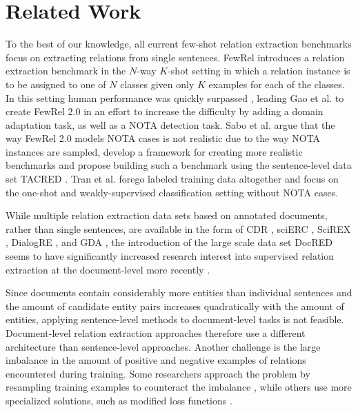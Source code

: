 \documentclass[11pt]{article}
\begin{document}
\section{Related Work}
\label{sec:related_work}

To the best of our knowledge, all current few-shot relation extraction benchmarks \cite{han_fewrel_2018, gao_fewrel_2019, sabo_revisiting_2021} focus on extracting relations from single sentences. 
FewRel \cite{han_fewrel_2018} introduces a relation extraction benchmark in the $N$-way $K$-shot setting \cite{vinyals_matching_2016,snell_prototypical_2017} in which a relation instance is to be assigned to one of $N$ classes given only $K$ examples for each of the classes.
In this setting human performance was quickly surpassed \cite{soares_matching_2019}, leading Gao et al. \cite{gao_fewrel_2019} to create FewRel 2.0 in an effort to increase the difficulty by adding a domain adaptation task, as well as a NOTA detection task. 
Sabo et al. \cite{sabo_revisiting_2021} argue that the way FewRel 2.0 models NOTA cases is not realistic due to the way NOTA instances are sampled, develop a framework for creating more realistic benchmarks and propose building such a benchmark using the sentence-level data set TACRED \cite{zhang_position-aware_2017}.
Tran et al. \cite{tran_one-shot_2021} forego labeled training data altogether and focus on the one-shot and weakly-supervised classification setting without NOTA cases.


While multiple relation extraction data sets based on annotated documents, rather than single sentences, are available in the form of CDR \cite{li_biocreative_2016}, sciERC \cite{luan_multi-task_2018}, SciREX \cite{jain-etal-2020-scirex}, DialogRE \cite{yu2020dialogue}, and GDA \cite{wu_renet_2019}, the introduction of the large scale data set DocRED \cite{yao_docred_2019} seems to have significantly increased research interest into supervised relation extraction at the document-level more recently \cite{zhou_document-level_2020,zhang_document-level_2021,xu_entity_2021,xiao_sais_2021}.

Since documents contain considerably more entities than individual sentences and the amount of candidate entity pairs increases quadratically with the amount of entities, applying sentence-level methods to document-level tasks is not feasible.
Document-level relation extraction approaches therefore use a different architecture \cite{wang_extracting_2019} than sentence-level approaches.
Another challenge is the large imbalance in the amount of positive and negative examples of relations encountered during training. 
Some researchers approach the problem by resampling training examples to counteract the imbalance \cite{han_novel_2020}, while others use more specialized solutions, such as modified loss functions \cite{zhou_document-level_2020}.
\end{document}
